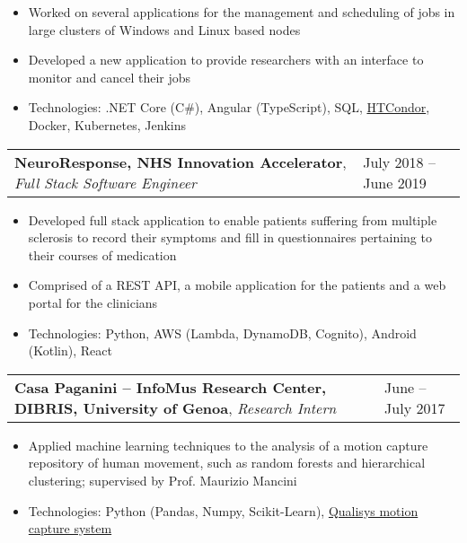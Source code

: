 \documentclass[a4paper, 10pt]{article}
\makeatletter
\newenvironment{workdetails}{\addvspace{3pt} \begin{tabu} to \textwidth {@{}X[4l] X[1r]@{}}}{\end{tabu}}
\newcommand{\company}[1]{\normalsize \textbf{#1}}
\newcommand{\timerange}[1]{\normalsize #1}
\newcommand{\position}[1]{\normalsize \textit{#1}}
\newenvironment{info}{\small \begin{itemize}[
    noitemsep,
    topsep=-3pt,
    leftmargin=*,
    align=parleft
]}{\end{itemize}}
\newcommand{\Csh}{C\#}
\makeatother
\begin{document}
        \begin{info}
            \item Worked on several applications for the management and scheduling of jobs in large clusters of Windows and Linux based nodes
            \item Developed a new application to provide researchers with an interface to monitor and cancel their jobs
            \item Technologies: .NET Core (\Csh{}), Angular (TypeScript), SQL, \href{https://research.cs.wisc.edu/htcondor/}{HTCondor}, Docker, Kubernetes, Jenkins
        \end{info}
    
    
    
    
        \begin{workdetails}
            \company{NeuroResponse, NHS Innovation Accelerator}, \position{Full Stack Software Engineer} & \timerange{July 2018 -- June 2019}
        \end{workdetails}

        \begin{info}
            \item Developed full stack application to enable patients suffering from multiple sclerosis to record their symptoms and fill in questionnaires pertaining to their courses of medication
            \item Comprised of a REST API, a mobile application for the patients and a web portal for the clinicians
            \item Technologies: Python, AWS (Lambda, DynamoDB, Cognito), Android (Kotlin), React
        \end{info}

        \begin{workdetails}
            \company{Casa Paganini -- InfoMus Research Center, DIBRIS, University of Genoa}, \position{Research Intern} & \timerange{June -- July 2017}
        \end{workdetails}

        \begin{info}
            \item Applied machine learning techniques to the analysis of a motion capture repository of human movement, such as random forests and hierarchical clustering; supervised by Prof. Maurizio Mancini
            \item Technologies: Python (Pandas, Numpy, Scikit-Learn), \href{http://www.qualisys.com/software/qualisys-track-manager/}{Qualisys motion capture system}
        \end{info}
\end{document}
